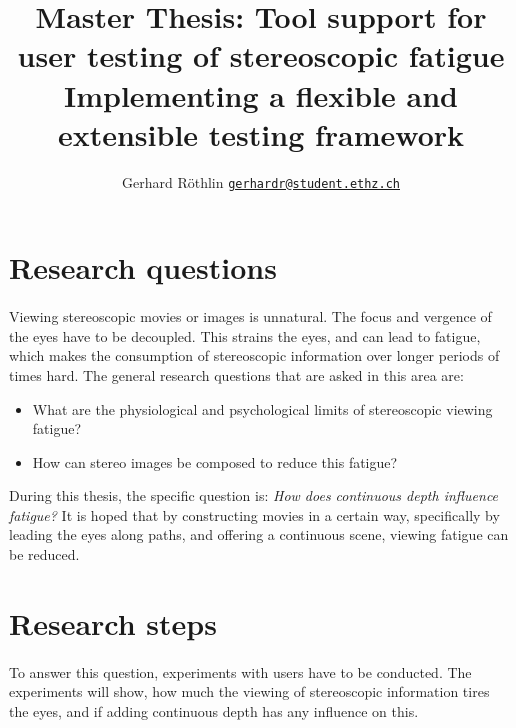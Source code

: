 \documentclass[11pt]{scrartcl}
\title{Master Thesis: Tool support for user testing of stereoscopic fatigue\\
{\large Implementing a flexible and extensible testing framework}}
\author{\normalsize Gerhard R\"othlin 
{\tt  \href{mailto:gerhardr@student.ethz.ch}{gerhardr@student.ethz.ch}}}
\date{}
\begin{document}
\maketitle



\begin{multicols}{2}


\section{Research questions}
\paragraph{}
Viewing stereoscopic movies or images is unnatural. The focus and vergence of the eyes have to be decoupled. This strains the eyes, and can lead to fatigue, which makes the consumption of stereoscopic information over longer periods of times hard. The general research questions that are asked in this area are:
\begin{itemize}
\item What are the physiological and psychological limits of stereoscopic viewing fatigue?
\item How can stereo images be composed to reduce this fatigue?
\end{itemize}

During this thesis, the specific question is: {\it How does continuous depth influence fatigue?} It is hoped that by constructing movies in a certain way, specifically by leading the eyes along paths, and offering a continuous scene, viewing fatigue can be reduced.

\section{Research steps}
\paragraph{}
To answer this question, experiments with users have to be conducted. The experiments will show, how much the viewing of stereoscopic information tires the eyes, and if adding continuous depth has any influence on this.


\end{multicols}
\end{document}
